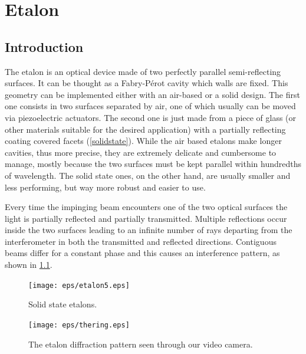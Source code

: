\chapter{Etalon}\label{etalon}
	\section{Introduction}
The etalon is an optical device made of two perfectly parallel semi-reflecting surfaces. It can be thought as a Fabry-P\'erot cavity which walls are fixed. This geometry can be implemented either with an air-based or a solid design. The first one consists in two surfaces separated by air, one of which usually can be moved via piezoelectric actuators. The second one is just made from a piece of glass (or other materials suitable for the desired application) with a partially reflecting coating covered facets (\cref{solidstate}). While the air based etalons make longer cavities, thus more precise, they are extremely delicate and cumbersome to manage, mostly because the two surfaces must be kept parallel within hundredths of wavelength. The solid state ones, on the other hand, are usually smaller and less performing, but way more robust and easier to use.

Every time the impinging beam encounters one of the two optical surfaces the light is partially reflected and partially transmitted. Multiple reflections occur inside the two surfaces leading to an infinite number of rays departing from the interferometer in both the transmitted and reflected directions. Contiguous beams differ for a constant phase and this causes an interference pattern, as shown in \cref{etalonmonitor}.

\begin{figure}[!hbt]\centering
\begin{minipage}[t]{0.46\textwidth}\centering
\texttt{[image: eps/etalon5.eps]}
\caption{Solid state etalons.}
\label{solidstate}
\end{minipage}
\hfill
\begin{minipage}[t]{0.46\textwidth}\centering
\texttt{[image: eps/thering.eps]}
\caption{The etalon diffraction pattern seen through our video camera.}
\label{etalonmonitor}
\end{minipage}
\end{figure}


